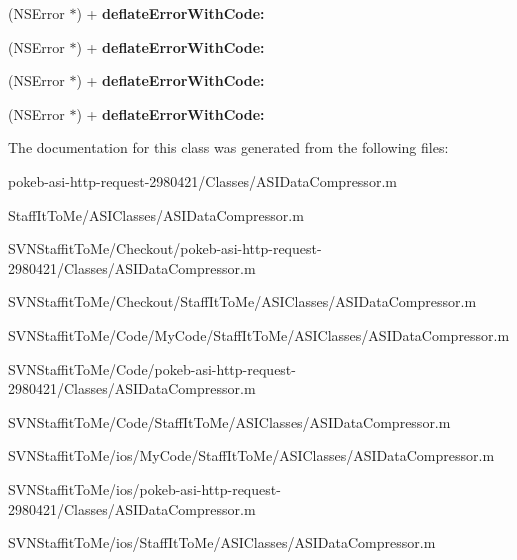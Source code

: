 \begin{DoxyCompactItemize}
\item 
\hypertarget{interface_a_s_i_data_compressor_07_08_aa5574c3985866bdee75f28923a06c4fd}{
(\-N\-S\-Error $\ast$) + {\bfseries deflate\-Error\-With\-Code\-:}}
\label{interface_a_s_i_data_compressor_07_08_aa5574c3985866bdee75f28923a06c4fd}

\item 
\hypertarget{interface_a_s_i_data_compressor_07_08_aa5574c3985866bdee75f28923a06c4fd}{
(\-N\-S\-Error $\ast$) + {\bfseries deflate\-Error\-With\-Code\-:}}
\label{interface_a_s_i_data_compressor_07_08_aa5574c3985866bdee75f28923a06c4fd}

\item 
\hypertarget{interface_a_s_i_data_compressor_07_08_aa5574c3985866bdee75f28923a06c4fd}{
(\-N\-S\-Error $\ast$) + {\bfseries deflate\-Error\-With\-Code\-:}}
\label{interface_a_s_i_data_compressor_07_08_aa5574c3985866bdee75f28923a06c4fd}

\item 
\hypertarget{interface_a_s_i_data_compressor_07_08_aa5574c3985866bdee75f28923a06c4fd}{
(\-N\-S\-Error $\ast$) + {\bfseries deflate\-Error\-With\-Code\-:}}
\label{interface_a_s_i_data_compressor_07_08_aa5574c3985866bdee75f28923a06c4fd}

\end{DoxyCompactItemize}


\-The documentation for this class was generated from the following files\-:\begin{DoxyCompactItemize}
\item 
pokeb-\/asi-\/http-\/request-\/2980421/\-Classes/\-A\-S\-I\-Data\-Compressor.\-m\item 
\-Staff\-It\-To\-Me/\-A\-S\-I\-Classes/\-A\-S\-I\-Data\-Compressor.\-m\item 
\-S\-V\-N\-Staffit\-To\-Me/\-Checkout/pokeb-\/asi-\/http-\/request-\/2980421/\-Classes/\-A\-S\-I\-Data\-Compressor.\-m\item 
\-S\-V\-N\-Staffit\-To\-Me/\-Checkout/\-Staff\-It\-To\-Me/\-A\-S\-I\-Classes/\-A\-S\-I\-Data\-Compressor.\-m\item 
\-S\-V\-N\-Staffit\-To\-Me/\-Code/\-My\-Code/\-Staff\-It\-To\-Me/\-A\-S\-I\-Classes/\-A\-S\-I\-Data\-Compressor.\-m\item 
\-S\-V\-N\-Staffit\-To\-Me/\-Code/pokeb-\/asi-\/http-\/request-\/2980421/\-Classes/\-A\-S\-I\-Data\-Compressor.\-m\item 
\-S\-V\-N\-Staffit\-To\-Me/\-Code/\-Staff\-It\-To\-Me/\-A\-S\-I\-Classes/\-A\-S\-I\-Data\-Compressor.\-m\item 
\-S\-V\-N\-Staffit\-To\-Me/ios/\-My\-Code/\-Staff\-It\-To\-Me/\-A\-S\-I\-Classes/\-A\-S\-I\-Data\-Compressor.\-m\item 
\-S\-V\-N\-Staffit\-To\-Me/ios/pokeb-\/asi-\/http-\/request-\/2980421/\-Classes/\-A\-S\-I\-Data\-Compressor.\-m\item 
\-S\-V\-N\-Staffit\-To\-Me/ios/\-Staff\-It\-To\-Me/\-A\-S\-I\-Classes/\-A\-S\-I\-Data\-Compressor.\-m\end{DoxyCompactItemize}
